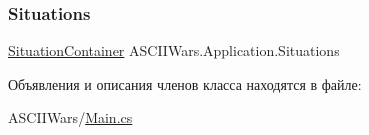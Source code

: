 \hypertarget{class_a_s_c_i_i_wars_1_1_application_ac5e91ee1a174bcb2d25ca9d40bf981b7}{}\label{class_a_s_c_i_i_wars_1_1_application_ac5e91ee1a174bcb2d25ca9d40bf981b7} 
\subsubsection{\texorpdfstring{Situations}{Situations}}
{\footnotesize\ttfamily \hyperlink{class_a_s_c_i_i_wars_1_1_game_1_1_situation_container}{Situation\+Container} A\+S\+C\+I\+I\+Wars.\+Application.\+Situations\hspace{0.3cm}{\ttfamily [static]}}



Объявления и описания членов класса находятся в файле\+:\begin{DoxyCompactItemize}
\item 
A\+S\+C\+I\+I\+Wars/\hyperlink{_main_8cs}{Main.\+cs}\end{DoxyCompactItemize}
